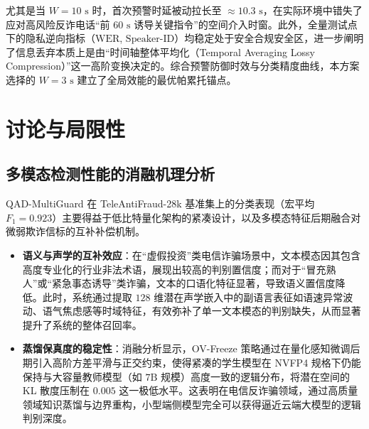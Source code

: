 \documentclass[11pt, a4paper]{article}
\begin{document}
尤其是当 $W = 10\text{ s}$ 时，首次预警时延被动拉长至 $\approx 10.3\text{ s}$，在实际环境中错失了应对高风险反诈电话“前 $60\text{ s}$ 诱导关键指令”的空间介入时窗。此外，全量测试点下的隐私逆向指标（$\mathrm{WER}$, $\mathrm{Speaker\text{-}ID}$）均稳定处于安全合规安全区，进一步阐明了信息丢弃本质上是由“时间轴整体平均化（Temporal Averaging Lossy Compression）”这一高阶变换决定的。综合预警防御时效与分类精度曲线，本方案选择的 $W = 3\text{ s}$ 建立了全局效能的最优帕累托锚点。







\section{讨论与局限性}
\subsection{多模态检测性能的消融机理分析}

QAD-MultiGuard 在 TeleAntiFraud-28k 基准集上的分类表现（宏平均 $F_1 = 0.923$）主要得益于低比特量化架构的紧凑设计，以及多模态特征后期融合对微弱欺诈信标的互补补偿机制。

\begin{itemize}
    \item \textbf{语义与声学的互补效应}：在“虚假投资”类电信诈骗场景中，文本模态因其包含高度专业化的行业非法术语，展现出较高的判别置信度；而对于“冒充熟人”或“紧急事态诱导”类诈骗，文本的口语化特征显著，导致语义置信度降低。此时，系统通过提取 $128$ 维潜在声学嵌入中的副语言表征如语速异常波动、语气焦虑感等时域特征，有效弥补了单一文本模态的判别缺失，从而显著提升了系统的整体召回率。
    \item \textbf{蒸馏保真度的稳定性}：消融分析显示，OV-Freeze 策略通过在量化感知微调后期引入高阶方差平滑与正交约束，使得紧凑的学生模型在 NVFP4 规格下仍能保持与大容量教师模型（如 $7\mathrm{B}$ 规模）高度一致的逻辑分布，将潜在空间的 KL 散度压制在 $0.005$ 这一极低水平。这表明在电信反诈骗领域，通过高质量领域知识蒸馏与边界重构，小型端侧模型完全可以获得逼近云端大模型的逻辑判别深度。
\end{itemize}
\end{document}
